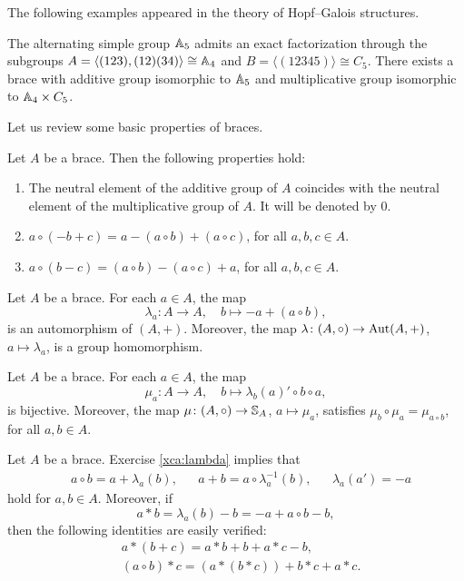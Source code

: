 The following examples appeared in the theory of 
Hopf--Galois structures.

\begin{example} 
	\label{exa:a5a4c5}
	The alternating simple group $\mathbb{A}_5$ admits an exact factorization
  through the subgroups 
  $A=\langle (123),(12)(34)\rangle\cong\mathbb{A}_4$ and 
  $B=\langle(12345)\rangle\cong C_5$.  
  There exists a brace with additive group isomorphic to $\mathbb{A}_5$ and multiplicative
  group isomorphic to $\mathbb{A}_4\times C_5$. 
\end{example}

Let us review some basic properties of braces. 

\begin{exercise}
\label{xca:0=1}
Let $A$ be a brace. Then the following properties hold:
\begin{enumerate}
    \item The neutral element of the additive group of $A$ coincides with 
    the neutral element of the multiplicative group of $A$. It will be denoted
    by $0$. 
    \item $a\circ(-b+c)=a-(a\circ b)+(a\circ c)$, for all $a,b,c\in A$.
    \item $a\circ(b-c)=(a\circ b)-(a\circ c)+a$, for all $a,b,c\in A$.
\end{enumerate}
\end{exercise}

\begin{exercise}
\label{xca:lambda}
    Let $A$ be a brace. For each $a\in A$, the map
    \[
        \lambda_a\colon A\to A,\quad
        b\mapsto -a+(a\circ b),
    \]
    is an automorphism of $(A,+)$. Moreover, the map 
    $\lambda\colon (A,\circ)\to\operatorname{Aut}(A,+)$, $a\mapsto\lambda_a$, is a group homomorphism. 
\end{exercise}

\begin{exercise}
\label{xca:mu}
    Let $A$ be a brace. For each $a\in A$, the map
    \[
        \mu_a\colon A\to A,\quad
        b\mapsto \lambda_b(a)'\circ b\circ a,
    \]
    is bijective. Moreover, the map 
    $\mu\colon (A,\circ)\to\mathbb{S}_A$, $a\mapsto\mu_a$, satisfies $\mu_b\circ\mu_a=\mu_{a\circ b}$, for all $a,b\in A$. 
\end{exercise}

Let $A$ be a brace. 
Exercise \ref{xca:lambda} implies that 
\begin{align}
\label{eq:formulas}
&a\circ b = a+\lambda_a(b),
&&a+b=a\circ \lambda^{-1}_a(b),
&&\lambda_a(a')=-a
\end{align}
hold for $a,b\in A$. Moreover, if 
\[
    a*b=\lambda_a(b)-b=-a+a\circ b-b,
\]
then the following identities are easily verified:
\begin{align}
&a*(b+c)=a*b+b+a*c-b,\\
&(a\circ b)*c=(a*(b*c))+b*c+a*c.
\end{align}


